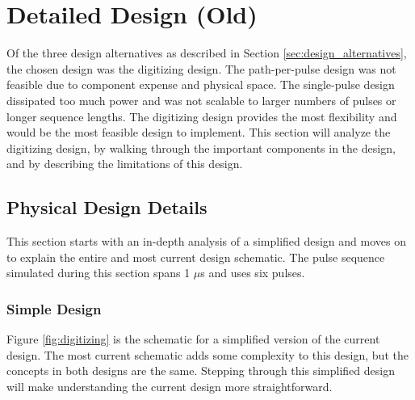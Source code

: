 \documentclass[pdftex,12pt,a4paper]{article}
\begin{document}
\section{Detailed Design (Old)}
\label{sec:detailed_design}

Of the three design alternatives as described in Section  \ref{sec:design_alternatives}, the chosen design was the digitizing design. The path-per-pulse design was not feasible due to component expense and physical space. The single-pulse design dissipated too much power and was not scalable to larger numbers of pulses or longer sequence  lengths. The digitizing design provides the most flexibility and would be the most feasible design to implement. This section will analyze the digitizing design, by walking through the important components in the design, and by describing the limitations of this design.

    
\subsection{Physical Design Details}
This section starts with an in-depth analysis of a simplified design and moves on to explain the entire and most current design schematic. The pulse sequence simulated during this section spans 1 $\mu$s and uses six pulses. 

\subsubsection{Simple Design} 
\label{sec:simple_walkthrough}
Figure \ref{fig:digitizing} is the schematic for a simplified version of the current design. The most current schematic adds some complexity to this design, but the concepts in both designs are the same. Stepping through this simplified design will make understanding the current design more straightforward. 
\end{document}
